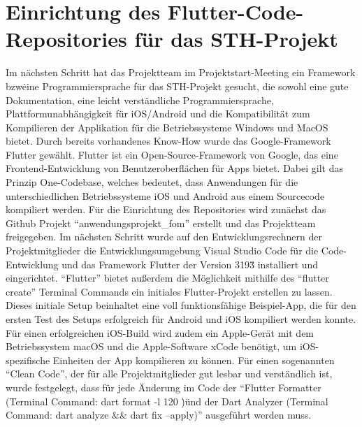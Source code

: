\section{Einrichtung des Flutter-Code-Repositories für das STH-Projekt}
Im nächsten Schritt hat das Projektteam im Projektstart-Meeting ein Framework bzw\. eine Programmiersprache für das STH-Projekt gesucht, die sowohl eine gute Dokumentation, eine leicht verständliche Programmiersprache, Plattformunabhängigkeit für iOS/Android und die Kompatibilität zum Kompilieren der Applikation für die Betriebssysteme Windows und MacOS bietet.
Durch bereits vorhandenes Know-How wurde das Google-Framework Flutter gewählt.\newline
Flutter ist ein Open-Source-Framework von Google, das eine Frontend-Entwicklung von Benutzeroberflächen für Apps bietet.
Dabei gilt das Prinzip One-Codebase, welches bedeutet, dass Anwendungen für die unterschiedlichen Betriebssysteme iOS und Android aus einem Sourcecode kompiliert werden.
\newline
Für die Einrichtung des Repositories wird zunächst das Github Projekt ``anwendungsprojekt\_fom'' erstellt und das Projektteam freigegeben.
Im nächsten Schritt wurde auf den Entwicklungsrechnern der Projektmitglieder die Entwicklungsumgebung Visual Studio Code für die Code-Entwicklung und das Framework Flutter der Version 3\.19\.3 installiert und eingerichtet.
``Flutter'' bietet außerdem die Möglichkeit mithilfe des ``flutter create'' Terminal Commands ein initiales Flutter-Projekt erstellen zu lassen.
Dieses initiale Setup beinhaltet eine voll funktionsfähige Beispiel-App, die für den ersten Test des Setups erfolgreich für Android und iOS kompiliert werden konnte.
Für einen erfolgreichen iOS-Build wird zudem ein Apple-Gerät mit dem Betriebssystem macOS und die Apple-Software xCode benötigt, um iOS-spezifische Einheiten der App kompilieren zu können.
\newline
Für einen sogenannten ``Clean Code'', der für alle Projektmitglieder gut lesbar und verständlich ist, wurde festgelegt, dass für jede Änderung im Code der ``Flutter Formatter (Terminal Command: dart format -l 120 \.)\" und der Dart Analyzer (Terminal Command: dart analyze \&\& dart fix --apply)'' ausgeführt werden muss.
